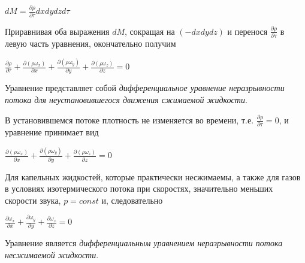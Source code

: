 \documentclass[12pt, a4paper]{article}
\begin{document}
	\begin{center}
		\( dM = \frac{\partial \rho}{\partial \tau} dxdydzd\tau \)
	\end{center}
	\par Приравнивая оба выражения \( dM \), сокращая на \( (-dxdydz) \) и перенося \( \frac{\partial \rho}{\partial \tau} \) в левую часть уравнения, окончательно получим
	\begin{center}
		\( \frac{\partial \rho}{\partial \tau} + \frac{\partial (\rho \omega_x)}{\partial x} + \frac{\partial (\rho \omega_y)}{\partial y} + \frac{\partial (\rho \omega_z)}{\partial z} = 0 \)
	\end{center}
	\par Уравнение представляет собой \textit{дифференциальное уравнение неразрывности потока для неустановившегося движения сжимаемой жидкости}.
	\par В установившемся потоке плотность не изменяется во времени, т.е. \( \frac{\partial \rho}{\partial \tau} = 0 \), и уравнение принимает вид
	\begin{center}
		\( \frac{\partial (\rho \omega_x)}{\partial x} + \frac{\partial (\rho \omega_y)}{\partial y} + \frac{\partial (\rho \omega_z)}{\partial z} = 0 \)
	\end{center}
	\par Для капельных жидкостей, которые практически несжимаемы, а также для газов в условиях изотермического потока при скоростях, значительно меньших скорости звука, \( p = const \) и, следовательно
	\begin{center}
		\( \frac{\partial \omega_x}{\partial x} + \frac{\partial \omega_y}{\partial y} + \frac{\partial \omega_z}{\partial z} = 0 \)
	\end{center}
	\par Уравнение является \textit{дифференциальным уравнением неразрывности потока несжимаемой жидкости}.
\end{document}
